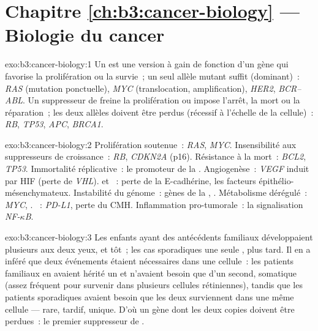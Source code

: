 \section*{Chapitre \ref{ch:b3:cancer-biology} --- Biologie du cancer}

\begin{solution}{exo:b3:cancer-biology:1}
Un  est une version à gain de fonction d'un gène qui favorise
la prolifération ou la survie~; un seul allèle mutant suffit
(dominant)~: \emph{RAS} (mutation ponctuelle), \emph{MYC}
(translocation, amplification), \emph{HER2}, \emph{BCR--ABL}. Un
suppresseur de  freine la prolifération ou impose l'arrêt, la
mort ou la réparation~; les deux allèles doivent être perdus (récessif
à l'échelle de la cellule)~: \emph{RB}, \emph{TP53}, \emph{APC},
\emph{BRCA1}.
\end{solution}

\begin{solution}{exo:b3:cancer-biology:2}
Prolifération soutenue~: \emph{RAS}, \emph{MYC}. Insensibilité aux
suppresseurs de croissance~: \emph{RB}, \emph{CDKN2A} (p16). Résistance
à la mort~: \emph{BCL2}, \emph{TP53}. Immortalité réplicative~: le
promoteur de la . Angiogenèse~: \emph{VEGF} induit par HIF
(perte de \emph{VHL}).  et ~: perte de la
E-cadhérine, les facteurs épithélio-mésenchymateux. Instabilité du
génome~: gènes de la , \emph{}.
Métabolisme dérégulé~: \emph{MYC}, . ~:
\emph{PD-L1}, perte du CMH. Inflammation pro-tumorale~: la
signalisation \emph{NF-$\kappa$B}.
\end{solution}

\begin{solution}{exo:b3:cancer-biology:3}
Les enfants ayant des antécédents familiaux développaient plusieurs
 aux deux yeux, et tôt~; les cas sporadiques une seule ,
plus tard. Il en a inféré que deux événements étaient nécessaires dans
une cellule~: les patients familiaux en avaient hérité un et n'avaient
besoin que d'un second, somatique (assez fréquent pour survenir dans
plusieurs cellules rétiniennes), tandis que les patients sporadiques
avaient besoin que les deux surviennent dans une même cellule ---
rare, tardif, unique. D'où un gène dont les deux copies doivent être
perdues~: le premier suppresseur de .
\end{solution}

